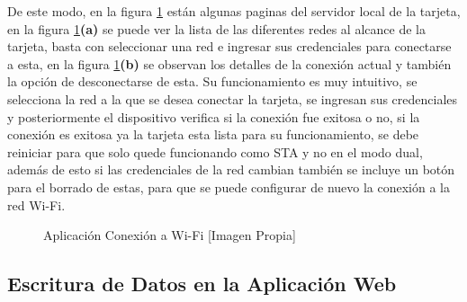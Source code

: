 De este modo, en la figura \ref{fig:wifi} están algunas paginas del servidor local de la tarjeta, en la figura \ref{fig:wifi}\textbf{(a)} se puede ver la lista de las diferentes redes al alcance de la tarjeta, basta con seleccionar una red e ingresar sus credenciales para conectarse a esta, en la figura \ref{fig:wifi}\textbf{(b)} se observan los detalles de la conexión actual y también la opción de desconectarse de esta. Su funcionamiento es muy intuitivo, se selecciona la red a la que se desea conectar la tarjeta, se ingresan sus credenciales y posteriormente el dispositivo verifica si la conexión fue exitosa o no, si la conexión es exitosa ya la tarjeta esta lista para su funcionamiento, se debe reiniciar para que solo quede funcionando como STA y no en el modo dual, además de esto si las credenciales de la red cambian también se incluye un botón para el borrado de estas, para que se puede configurar de nuevo la conexión a la red Wi-Fi.

\begin{figure}[H]
	\centering
	\caption{Aplicación Conexión a Wi-Fi [Imagen Propia]}
	\label{fig:wifi}
\end{figure}

\subsection{Escritura de Datos en la Aplicación Web}

